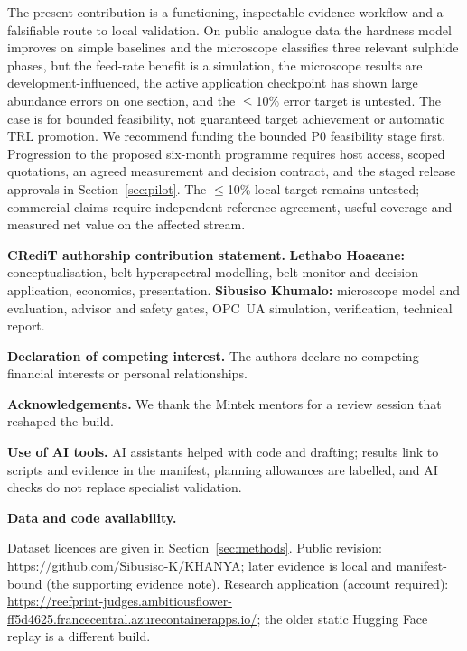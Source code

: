 \documentclass[10pt,a4paper,twocolumn]{article}
\newcommand{\backsec}[1]{\par\smallskip\noindent\textbf{#1}\quad\ignorespaces}
\begin{document}
The present contribution is a functioning, inspectable evidence workflow and a falsifiable route to local validation. On public analogue data the hardness model improves on simple baselines and the microscope classifies three relevant sulphide phases, but the feed-rate benefit is a simulation, the microscope results are development-influenced, the active application checkpoint has shown large abundance errors on one section, and the $\leq$10\% error target is untested. The case is for bounded feasibility, not guaranteed target achievement or automatic TRL promotion. We recommend funding the bounded P0 feasibility stage first. Progression to the proposed six-month programme requires host access, scoped quotations, an agreed measurement and decision contract, and the staged release approvals in Section~\ref{sec:pilot}. The $\leq$10\% local target remains untested; commercial claims require independent reference agreement, useful coverage and measured net value on the affected stream.

\small
\backsec{CRediT authorship contribution statement.}
\textbf{Lethabo Hoaeane:} conceptualisation, belt hyperspectral modelling, belt monitor and decision application, economics, presentation. \textbf{Sibusiso Khumalo:} microscope model and evaluation, advisor and safety gates, OPC~UA simulation, verification, technical report.

\backsec{Declaration of competing interest.}
The authors declare no competing financial interests or personal relationships.

\backsec{Acknowledgements.}
We thank the Mintek mentors for a review session that reshaped the build.

\backsec{Use of AI tools.}
AI assistants helped with code and drafting; results link to scripts and evidence in the manifest, planning allowances are labelled, and AI checks do not replace specialist validation.

\backsec{Data and code availability.}
{\raggedright Dataset licences are given in Section~\ref{sec:methods}. Public revision: \url{https://github.com/Sibusiso-K/KHANYA}; later evidence is local and manifest-bound (the supporting evidence note). Research application (account required): \url{https://reefprint-judges.ambitiousflower-ff5d4625.francecentral.azurecontainerapps.io/}; the older static Hugging Face replay is a different build.\par}
\end{document}
